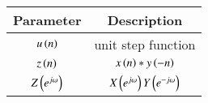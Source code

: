\renewcommand{\arraystretch}{1.5}
\begin{tabular}{|c|c|}
\hline
Parameter & Description  \\\hline
$u\left(n\right)$& unit step function \\\hline
$z\left(n\right)$ & $x\left(n\right)*y\left(-n\right)$ \\\hline
$Z\left(e^{j\omega}\right)$ & $X\left(e^{j\omega}\right) Y\left(e^{-j \omega}\right)$ \\\hline
\end{tabular}
